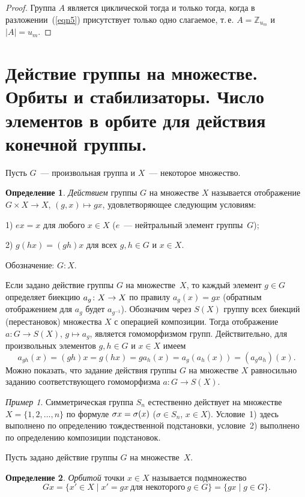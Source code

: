 \documentclass[a4paper, 12pt]{article}
\def\ZZ{{\mathbb Z}}%
\theoremstyle{definition}
\newtheorem{definition}{Определение}
\theoremstyle{remark}
\newtheorem{example}{Пример}
\begin{document}
\begin{proof}
Группа $A$ является циклической тогда и только тогда, когда в
разложении~(\ref{eqn5}) присутствует только одно слагаемое, т.\,е.
$A = \ZZ_{u_m}$ и $|A| = u_m$.
\end{proof}


\section{Действие группы на множестве. Орбиты и стабилизаторы. Число элементов в орбите для действия конечной группы.}

Пусть $G$~--- произвольная группа и $X$~--- некоторое множество.

\begin{definition}
\textit{Действием} группы $G$ на множестве $X$ называется
отображение $G\times X\to X$, $(g,x)\mapsto gx$, удовлетворяющее
следующим условиям:

1) $ex=x$ для любого $x\in X$ ($e$~--- нейтральный элемент
группы~$G$);

2) $g(hx)=(gh)x$ для всех $g,h\in G$ и $x\in X$.

Обозначение: $G:X$.
\end{definition}

Если задано действие группы $G$ на множестве~$X$, то каждый элемент
$g \in G$ определяет биекцию $a_g \colon X \to\nobreak X$ по правилу
$a_g(x) = gx$ (обратным отображением для $a_g$ будет $a_{g^{-1}}$).
Обозначим через $S(X)$ группу всех биекций (перестановок) множества
$X$ с операцией композиции. Тогда отображение $a \colon G \to S(X)$,
$g \mapsto a_g$, является гомоморфизмом групп. Действительно, для
произвольных элементов $g,h \in G$ и $x \in X$ имеем
$$
a_{gh}(x) = (gh)x = g(hx) = g a_h(x) = a_g (a_h(x)) = (a_g a_h)(x).
$$
Можно показать, что задание действия группы $G$ на множестве $X$
равносильно заданию соответствующего гомоморфизма $a \colon G \to
S(X)$.

\begin{example}
Симметрическая группа $S_n$ естественно действует на множестве $X =
\lbrace 1, 2, \ldots, n \rbrace$ по формуле $\sigma x =\nobreak
\sigma (x)$ ($\sigma \in S_n$, $x \in X$). Условие~1) здесь
выполнено по определению тождественной подстановки, условие~2)
выполнено по определению композиции подстановок.
\end{example}

Пусть задано действие группы $G$ на множестве~$X$.

\begin{definition}
{\it Орбитой} точки $x\in X$ называется подмножество
$$
Gx = \lbrace x' \in X \mid x' = gx \ \text{для некоторого} \ g \in G
\rbrace = \{ gx \mid g\in G\}.
$$
\end{definition}
\end{document}
